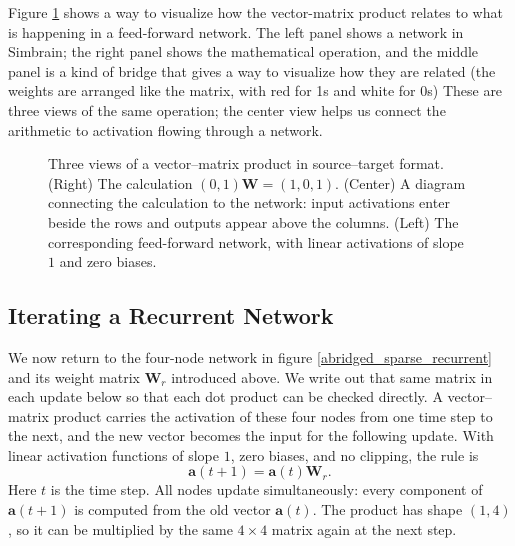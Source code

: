 Figure \ref{abridged_source_target} shows a way to visualize how the vector-matrix product relates to what is happening in a feed-forward network. The left panel shows a network in Simbrain; the right panel shows the mathematical operation, and the middle panel is a kind of bridge that gives a way to visualize how they are related (the weights are arranged like the matrix, with red for 1s and white for 0s)  These are three views of the same operation; the center view helps us connect the arithmetic to activation flowing through a network.

\begin{figure}[htp]
\centering
{}
\caption[Jeff Yoshimi.]{Three views of a vector--matrix product in source--target format. (Right) The calculation $(0,1)\mathbf{W}=(1,0,1)$. (Center) A diagram connecting the calculation to the network: input activations enter beside the rows and outputs appear above the columns. (Left) The corresponding feed-forward network, with linear activations of slope $1$ and zero biases.}
\label{abridged_source_target}
\end{figure}

\subsection{Iterating a Recurrent Network}\label{abridged_recurrent_iterations}

We now return to the four-node network in figure \ref{abridged_sparse_recurrent} and its weight matrix $\mathbf{W}_r$ introduced above. We write out that same matrix in each update below so that each dot product can be checked directly. A vector--matrix product carries the activation of these four nodes from one time step to the next, and the new vector becomes the input for the following update. With linear activation functions of slope $1$, zero biases, and no clipping, the rule is
\[
\mathbf{a}(t+1)=\mathbf{a}(t)\mathbf{W}_r.
\]
Here $t$ is the time step. All nodes update simultaneously: every component of $\mathbf{a}(t+1)$ is computed from the old vector $\mathbf{a}(t)$. The product has shape $(1,4)$, so it can be multiplied by the same $4\times4$ matrix again at the next step.

